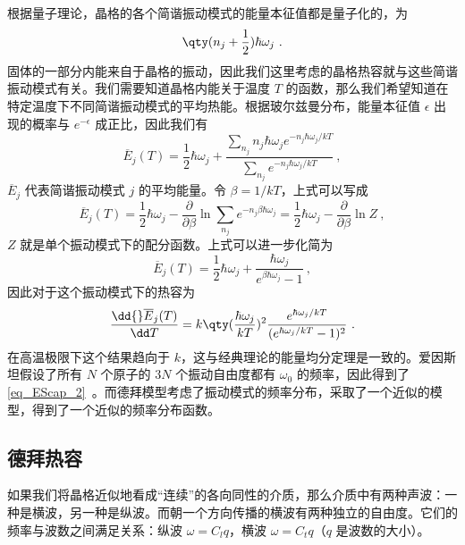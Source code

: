 

根据量子理论，晶格的各个简谐振动模式的能量本征值都是量子化的，为
\begin{equation}
\qty(n_j+\frac{1}{2})\hbar \omega_j~.
\end{equation}
固体的一部分内能来自于晶格的振动，因此我们这里考虑的晶格热容就与这些简谐振动模式有关。我们需要知道晶格内能关于温度 $T$ 的函数，那么我们希望知道在特定温度下不同简谐振动模式的平均热能。根据玻尔兹曼分布，能量本征值 $\epsilon$ 出现的概率与 $e^{-\epsilon}$ 成正比，因此我们有
\begin{equation}
\overline E_j(T)=\frac{1}{2}\hbar \omega_j + \frac{\sum_{n_j} n_j\hbar \omega_j e^{-n_j \hbar \omega_j / kT}}{\sum_{n_j} e^{-n_j \hbar \omega_j / kT}}~,
\end{equation}
$\overline E_j$ 代表简谐振动模式 $j$ 的平均能量。令 $\beta=1/kT$，上式可以写成
\begin{equation}
\overline E_j(T)=\frac{1}{2}\hbar \omega_j - \frac{\partial}{\partial \beta} \ln \sum_{n_j} e^{-n_j\beta\hbar\omega_j}=\frac{1}{2}\hbar \omega_j - \frac{\partial}{\partial \beta} \ln Z~,
\end{equation}
$Z$ 就是单个振动模式下的配分函数。上式可以进一步化简为
\begin{equation}
\overline E_j(T)=\frac{1}{2}\hbar \omega_j + \frac{\hbar \omega_j}{e^{\beta\hbar\omega_j}-1}~,
\end{equation}
因此对于这个振动模式下的热容为
\begin{equation}
\frac{\dd{} \overline E_j(T)}{\dd T}=k \qty(\frac{\hbar\omega_j}{kT})^2\frac{e^{\hbar \omega_j/kT}}{(e^{\hbar\omega_j/kT}-1)^2}~.
\end{equation}
在高温极限下这个结果趋向于 $k$，这与经典理论的能量均分定理是一致的。爱因斯坦假设了所有 $N$ 个原子的 $3N$ 个振动自由度都有 $\omega_0$ 的频率，因此得到了\autoref{eq_EScap_2}~。而德拜模型考虑了振动模式的频率分布，采取了一个近似的模型，得到了一个近似的频率分布函数。

\subsection{德拜热容}
如果我们将晶格近似地看成“连续”的各向同性的介质，那么介质中有两种声波：一种是横波，另一种是纵波。而朝一个方向传播的横波有两种独立的自由度。它们的频率与波数之间满足关系：纵波 $\omega=C_l q$，横波 $\omega=C_t q$（$q$ 是波数的大小）。

